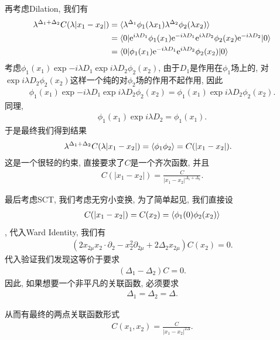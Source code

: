 再考虑Dilation, 我们有
\begin{align}
    \lambda^{\Delta_1+\Delta_2}C(\lambda|x_1-x_2|)&=\braket{\lambda^{\Delta_1}\phi_1(\lambda x_1)\lambda^{\Delta_2}\phi_2(\lambda x_2)}\\
    &=\braket{0|\mathrm e^{i\lambda D_1}\phi_1(x_1)\mathrm e^{-i\lambda D_1}\mathrm e^{i\lambda D_2}\phi_2(x_2)\mathrm e^{-i\lambda D_2}|0}\\
    &=\braket{0|\phi_1(x_1)\mathrm e^{-i\lambda D_1}\mathrm e^{i\lambda D_2}\phi_2(x_2)|0}
\end{align}
考虑$\phi_1(x_1)\exp{-i\lambda D_1}\exp{i\lambda D_2}\phi_2(x_2)$, 由于$D_1$是作用在$\phi_1$场上的, 对$\exp{i\lambda D_2}\phi_2(x_2)$这样一个纯的对$\phi_2$场的作用不起作用, 因此
\begin{align}
    \phi_1(x_1)\exp{-i\lambda D_1}\exp{i\lambda D_2}\phi_2(x_2)=\phi_1(x_1)\exp{i\lambda D_2}\phi_2(x_2).
\end{align}
同理, 
\begin{align}
    \phi_1(x_1)\exp{i\lambda D_2}=\phi_1(x_1).
\end{align}
于是最终我们得到结果
\begin{align}
    \lambda^{\Delta_1+\Delta_2}C(\lambda|x_1-x_2|)&=\braket{\phi_1\phi_2}=C(|x_1-x_2|).
\end{align}
这是一个很轻的约束, 直接要求了$C$是一个齐次函数, 并且
\begin{align}
    C(|x_1-x_2|)=\frac{C}{|x_1-x_2|^{\Delta_1+\Delta_2}}.
\end{align}

最后考虑SCT, 我们考虑无穷小变换, 为了简单起见, 我们直接设
\begin{align}
    C(|x_1-x_2|)=C(x_2)=\braket{\phi_1(0)\phi_2(x_2)}
\end{align}, 代入Ward Identity, 我们有
\begin{align}
    (2x_{2\mu}x_2\cdot\partial_2-x_2^2\partial_{2\mu}+2\Delta_2x_{2\mu})C(x_2)=0.
\end{align}
代入验证我们发现这等价于要求
\begin{align}
    (\Delta_1-\Delta_2)C=0.
\end{align}
因此, 如果想要一个非平凡的关联函数, 必须要求
\begin{align}
    \Delta_1=\Delta_2=\Delta.
\end{align}

从而有最终的两点关联函数形式
\begin{align}
    C(x_1, x_2)=\frac{C}{|x_1-x_2|^{2\Delta}}.
\end{align}